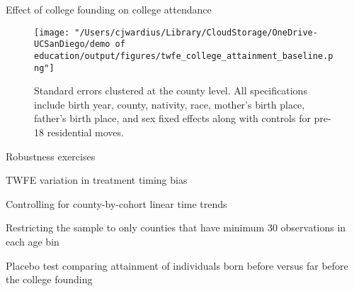\documentclass[notes,11pt, aspectratio=169]{beamer}
\newenvironment{wideitemize}{\itemize\addtolength{\itemsep}{10pt}}{\enditemize}
\begin{document}
\begin{frame}[label=baseline]{Effect of college founding on college attendance}
  \begin{figure}
        \centering
        \texttt{[image: "/Users/cjwardius/Library/CloudStorage/OneDrive-UCSanDiego/demo of education/output/figures/twfe\_college\_attainment\_baseline.png"]}
        \caption{Standard errors clustered at the county level. All specifications include birth year, county, nativity, race, mother's birth place, father's birth place, and sex fixed effects along with controls for pre-18 residential moves.}
    \end{figure}
\end{frame}



\begin{frame}[label=robustness]{Robustness exercises}
  \begin{wideitemize}
    \item TWFE variation in treatment timing bias \hyperlink{borusyak}{}
    \item Controlling for county-by-cohort linear time trends \hyperlink{county_trends}{}
    \item Restricting the sample to only counties that have minimum 30 observations in each age bin \hyperlink{min30}{}
    \item Placebo test comparing attainment of individuals born before versus far before the college founding \hyperlink{placebo}{}
  \end{wideitemize}
\end{frame}
\end{document}
